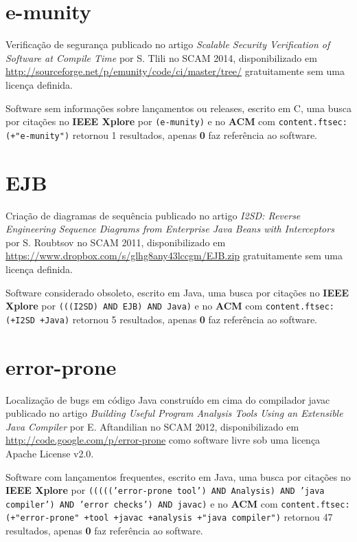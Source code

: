 \section{e-munity}

Verificação de segurança
publicado no artigo {\it Scalable Security Verification of Software at Compile Time}
por S. Tlili
no SCAM 2014,
disponibilizado em \url{http://sourceforge.net/p/emunity/code/ci/master/tree/}
gratuitamente
sem uma licença definida.

Software sem informações sobre lançamentos ou releases,
escrito em C,
uma busca por citações no {\bf IEEE Xplore} por
\texttt{(e-munity)}
e no {\bf ACM} com
\texttt{content.ftsec:(+"e-munity")}
retornou
1 resultados, apenas
{\bf 0} faz referência ao software.



\section{EJB}

Criação de diagramas de sequência
publicado no artigo {\it I2SD: Reverse Engineering Sequence Diagrams from Enterprise Java Beans with Interceptors}
por S. Roubtsov
no SCAM 2011,
disponibilizado em \url{https://www.dropbox.com/s/glhg8any43lccgm/EJB.zip}
gratuitamente
sem uma licença definida.

Software considerado obsoleto,
escrito em Java,
uma busca por citações no {\bf IEEE Xplore} por
\texttt{(((I2SD) AND EJB) AND Java)}
e no {\bf ACM} com
\texttt{content.ftsec:(+I2SD +Java)}
retornou
5 resultados, apenas
{\bf 0} faz referência ao software.



\section{error-prone}

Localização de bugs em código Java construído em cima do compilador javac
publicado no artigo {\it Building Useful Program Analysis Tools Using an Extensible Java Compiler}
por E. Aftandilian
no SCAM 2012,
disponibilizado em \url{http://code.google.com/p/error-prone}
como software livre
sob uma licença Apache License v2.0.

Software com lançamentos frequentes,
escrito em Java,
uma busca por citações no {\bf IEEE Xplore} por
\texttt{((((('error-prone tool') AND Analysis) AND 'java compiler') AND 'error checks') AND javac)}
e no {\bf ACM} com
\texttt{content.ftsec:(+"error-prone" +tool +javac +analysis +"java compiler")}
retornou
47 resultados, apenas
{\bf 0} faz referência ao software.




